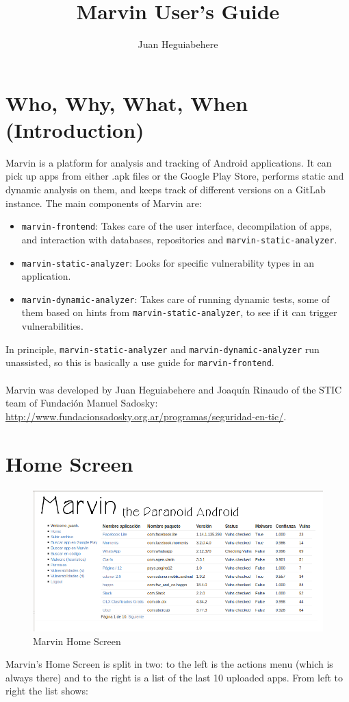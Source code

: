 \documentclass[11pt]{article}
\title{\textbf{Marvin User's Guide}}
\author{Juan Heguiabehere}
\date{}
\begin{document}
\maketitle
\section{Who, Why, What, When (Introduction)}
Marvin is a platform for analysis and tracking of Android applications. It can pick up apps from either .apk files or the Google Play Store, performs static and dynamic analysis on them, and keeps track of different versions on a GitLab instance. The main components of Marvin are:

\begin{itemize}
\item \texttt{marvin-frontend}: Takes care of the user interface, decompilation of apps, and interaction with databases, repositories and \texttt{marvin-static-analyzer}.
\item \texttt{marvin-static-analyzer}: Looks for specific vulnerability types in an application.
\item \texttt{marvin-dynamic-analyzer}: Takes care of running dynamic tests, some of them based on hints from \texttt{marvin-static-analyzer}, to see if it can trigger vulnerabilities.
\end{itemize}
In principle, \texttt{marvin-static-analyzer} and \texttt{marvin-dynamic-analyzer} run unassisted, so this is basically a use guide for \texttt{marvin-frontend}.

\paragraph*{} Marvin was developed by Juan Heguiabehere and Joaquín Rinaudo of the STIC team of Fundación Manuel Sadosky: \url{http://www.fundacionsadosky.org.ar/programas/seguridad-en-tic/}.
\section{Home Screen}
\begin{figure}[H]
\includegraphics[width=\textwidth]{graphics/marvin_main.png}
\caption{Marvin Home Screen}
\end{figure}
Marvin's Home Screen is split in two: to the left is the actions menu (which is always there) and to the right is a list of the last 10 uploaded apps. From left to right the list shows:
\end{document}
